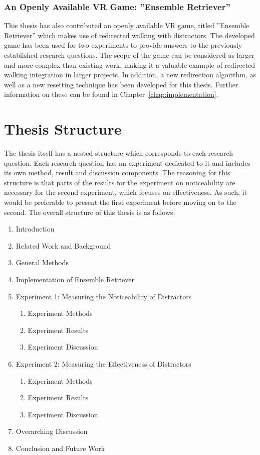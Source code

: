 \subsubsection{An Openly Available VR Game: ''Ensemble Retriever''}
This thesis has also contributed an openly available VR game, titled ''Ensemble Retriever'' which makes use of redirected walking with distractors. The developed game has been used for two experiments to provide answers to the previously established research questions. The scope of the game can be considered as larger and more complex than existing work, making it a valuable example of redirected walking integration in larger projects. In addition, a new redirection algorithm, as well as a new resetting technique has been developed for this thesis. Further information on these can be found in Chapter~\ref{chap:implementation}. 

\section{Thesis Structure}
The thesis itself has a nested structure which corresponds to each research question. Each research question has an experiment dedicated to it and includes its own method, result and discussion components. The reasoning for this structure is that parts of the results for the experiment on noticeability are necessary for the second experiment, which focuses on effectiveness. As such, it would be preferable to present the first experiment before moving on to the second. The overall structure of this thesis is as follows:

\begin{enumerate}
    \item Introduction
    \item Related Work and Background
    \item General Methods
    \item Implementation of Ensemble Retriever
    \item Experiment 1: Measuring the Noticeability of Distractors
    \begin{enumerate}
        \item Experiment Methods
        \item Experiment Results
        \item Experiment Discussion
    \end{enumerate}
    \item Experiment 2: Measuring the Effectiveness of Distractors
    \begin{enumerate}
        \item Experiment Methods
        \item Experiment Results
        \item Experiment Discussion
    \end{enumerate}
    \item Overarching Discussion
    \item Conclusion and Future Work
\end{enumerate}